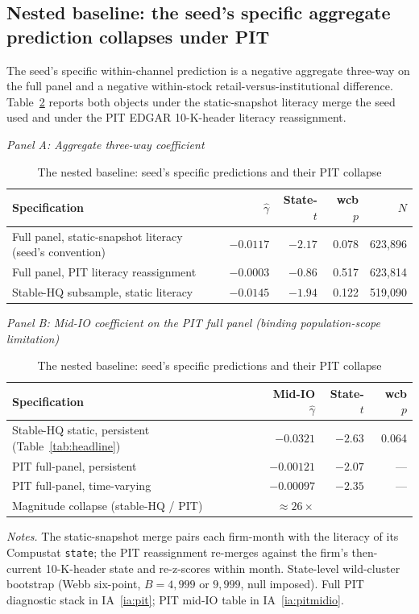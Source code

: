 \subsection{Nested baseline: the seed's specific aggregate prediction collapses under PIT}
\label{sec:nestedbaseline}

The seed's specific within-channel prediction is a negative aggregate three-way on the full panel and a negative within-stock retail-versus-institutional difference. Table~\ref{tab:nested} reports both objects under the static-snapshot literacy merge the seed used and under the PIT EDGAR 10-K-header literacy reassignment.

\begin{table}[t]
\centering
\caption{The nested baseline: seed's specific predictions and their PIT collapse}
\label{tab:nested}
\footnotesize
\begin{minipage}{\textwidth}
\centering
\textit{Panel A: Aggregate three-way coefficient}\\[2pt]
\begin{tabular}{lrrrr}
\toprule
Specification & $\hat\gamma$ & State-$t$ & wcb $p$ & $N$ \\
\midrule
Full panel, static-snapshot literacy (seed's convention) & $-0.0117$ & $-2.17$ & 0.078 & 623,896 \\
Full panel, PIT literacy reassignment                    & $-0.0003$ & $-0.86$ & 0.517 & 623,814 \\
Stable-HQ subsample, static literacy                     & $-0.0145$ & $-1.94$ & 0.122 & 519,090 \\
\bottomrule
\end{tabular}

\medskip
\textit{Panel B: Mid-IO coefficient on the PIT full panel (binding population-scope limitation)}\\[2pt]
\begin{tabular}{lrrr}
\toprule
Specification & Mid-IO $\hat\gamma$ & State-$t$ & wcb $p$ \\
\midrule
Stable-HQ static, persistent (Table~\ref{tab:headline}) & $-0.0321$ & $-2.63$ & 0.064 \\
PIT full-panel, persistent                              & $-0.00121$ & $-2.07$ & --- \\
PIT full-panel, time-varying                            & $-0.00097$ & $-2.35$ & --- \\
Magnitude collapse (stable-HQ / PIT)                    & $\approx 26\times$ & & \\
\bottomrule
\end{tabular}
\end{minipage}

\medskip
{\footnotesize\textit{Notes.} The static-snapshot merge pairs each firm-month with the literacy of its Compustat \texttt{state}; the PIT reassignment re-merges against the firm's then-current 10-K-header state and re-z-scores within month. State-level wild-cluster bootstrap (Webb six-point, $B = 4{,}999$ or $9{,}999$, null imposed). Full PIT diagnostic stack in IA~\ref{ia:pit}; PIT mid-IO table in IA~\ref{ia:pitmidio}.}
\end{table}

